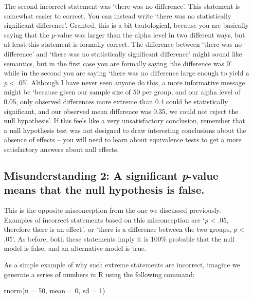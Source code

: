 \documentclass[
  oneside]{book}
\newenvironment{Shaded}{\begin{snugshade}}{\end{snugshade}}
\newcommand{\AttributeTok}[1]{\textcolor[rgb]{0.77,0.63,0.00}{#1}}
\newcommand{\DecValTok}[1]{\textcolor[rgb]{0.00,0.00,0.81}{#1}}
\newcommand{\FunctionTok}[1]{\textcolor[rgb]{0.00,0.00,0.00}{#1}}
\newcommand{\NormalTok}[1]{#1}
\begin{document}
The second incorrect statement was `there was no difference'. This statement is somewhat easier to correct. You can instead write `there was no statistically significant difference'. Granted, this is a bit tautological, because you are basically saying that the \emph{p}-value was larger than the alpha level in two different ways, but at least this statement is formally correct. The difference between `there was no difference' and `there was no statistically significant difference' might sound like semantics, but in the first case you are formally saying `the difference was 0' while in the second you are saying `there was no difference large enough to yield a \emph{p} \textless{} .05'. Although I have never seen anyone do this, a more informative message might be `because given our sample size of 50 per group, and our alpha level of 0.05, only observed differences more extreme than 0.4 could be statistically significant, and our observed mean difference was 0.35, we could not reject the null hypothesis'. If this feels like a very unsatisfactory conclusion, remember that a null hypothesis test was not designed to draw interesting conclusions about the absence of effects -- you will need to learn about equivalence tests to get a more satisfactory answers about null effects.

\hypertarget{misunderstanding-2-a-significant-p-value-means-that-the-null-hypothesis-is-false.}{%
\subsection{\texorpdfstring{Misunderstanding 2: A significant \emph{p}-value means that the null hypothesis is false.}{Misunderstanding 2: A significant p-value means that the null hypothesis is false.}}\label{misunderstanding-2-a-significant-p-value-means-that-the-null-hypothesis-is-false.}}

This is the opposite misconception from the one we discussed previously. Examples of incorrect statements based on this misconception are `\emph{p} \textless{} .05, therefore there is an effect', or `there is a difference between the two groups, \emph{p} \textless{} .05'. As before, both these statements imply it is 100\% probable that the null model is false, and an alternative model is true.

As a simple example of why such extreme statements are incorrect, imagine we generate a series of numbers in R using the following command:

\begin{Shaded}
\begin{Highlighting}[]
\FunctionTok{rnorm}\NormalTok{(}\AttributeTok{n =} \DecValTok{50}\NormalTok{, }\AttributeTok{mean =} \DecValTok{0}\NormalTok{, }\AttributeTok{sd =} \DecValTok{1}\NormalTok{)}
\end{Highlighting}
\end{Shaded}
\end{document}
